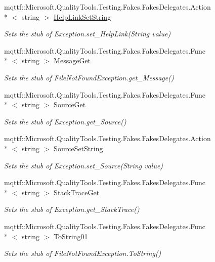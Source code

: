 \begin{DoxyCompactItemize}
mqttf\-::\-Microsoft.\-Quality\-Tools.\-Testing.\-Fakes.\-Fakes\-Delegates.\-Action\\*
$<$ string $>$ \hyperlink{class_system_1_1_i_o_1_1_fakes_1_1_stub_file_not_found_exception_a573a2accfcbee3106dc8e2f672495fe5}{Help\-Link\-Set\-String}
\begin{DoxyCompactList}\small\item\em Sets the stub of Exception.\-set\-\_\-\-Help\-Link(\-String value)\end{DoxyCompactList}\item 
mqttf\-::\-Microsoft.\-Quality\-Tools.\-Testing.\-Fakes.\-Fakes\-Delegates.\-Func\\*
$<$ string $>$ \hyperlink{class_system_1_1_i_o_1_1_fakes_1_1_stub_file_not_found_exception_acf87fda5fc73a2f01a86ac1d48d20e87}{Message\-Get}
\begin{DoxyCompactList}\small\item\em Sets the stub of File\-Not\-Found\-Exception.\-get\-\_\-\-Message()\end{DoxyCompactList}\item 
mqttf\-::\-Microsoft.\-Quality\-Tools.\-Testing.\-Fakes.\-Fakes\-Delegates.\-Func\\*
$<$ string $>$ \hyperlink{class_system_1_1_i_o_1_1_fakes_1_1_stub_file_not_found_exception_a94e2b40d37a5eb13ba28ea567850a47d}{Source\-Get}
\begin{DoxyCompactList}\small\item\em Sets the stub of Exception.\-get\-\_\-\-Source()\end{DoxyCompactList}\item 
mqttf\-::\-Microsoft.\-Quality\-Tools.\-Testing.\-Fakes.\-Fakes\-Delegates.\-Action\\*
$<$ string $>$ \hyperlink{class_system_1_1_i_o_1_1_fakes_1_1_stub_file_not_found_exception_abf31f6c660b70bcbbc8bcd4d65ed31c4}{Source\-Set\-String}
\begin{DoxyCompactList}\small\item\em Sets the stub of Exception.\-set\-\_\-\-Source(\-String value)\end{DoxyCompactList}\item 
mqttf\-::\-Microsoft.\-Quality\-Tools.\-Testing.\-Fakes.\-Fakes\-Delegates.\-Func\\*
$<$ string $>$ \hyperlink{class_system_1_1_i_o_1_1_fakes_1_1_stub_file_not_found_exception_af4225e6f924523e22a0ddc3f554a69cb}{Stack\-Trace\-Get}
\begin{DoxyCompactList}\small\item\em Sets the stub of Exception.\-get\-\_\-\-Stack\-Trace()\end{DoxyCompactList}\item 
mqttf\-::\-Microsoft.\-Quality\-Tools.\-Testing.\-Fakes.\-Fakes\-Delegates.\-Func\\*
$<$ string $>$ \hyperlink{class_system_1_1_i_o_1_1_fakes_1_1_stub_file_not_found_exception_a8882449a9ea07890ba2343fa4304ebff}{To\-String01}
\begin{DoxyCompactList}\small\item\em Sets the stub of File\-Not\-Found\-Exception.\-To\-String()\end{DoxyCompactList}\end{DoxyCompactItemize}

